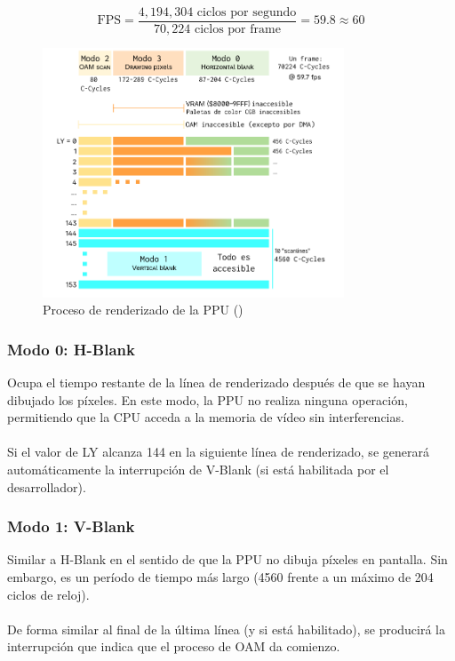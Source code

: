 \[
\text{FPS} = \frac{4,194,304 \text{ ciclos por segundo}}{70,224 \text{ ciclos por frame}} = 59.8 \approx 60
\]


\begin{figure}[H]
    \centering
    \includegraphics[width=0.8\textwidth]{include/images/render_gb.png}
    \caption{Proceso de renderizado de la PPU (\cite{newpandocs})}
    \label{figure:gb_render}
\end{figure}

\subsubsection{Modo 0: H-Blank}
Ocupa el tiempo restante de la línea de renderizado después de que se hayan dibujado los píxeles. En este modo, la PPU no realiza ninguna operación, permitiendo que la CPU acceda a la memoria de vídeo sin interferencias.
\\\\
Si el valor de LY alcanza 144 en la siguiente línea de renderizado, se generará automáticamente la interrupción de V-Blank (si está habilitada por el desarrollador).

\subsubsection{Modo 1: V-Blank}
Similar a H-Blank en el sentido de que la PPU no dibuja píxeles en pantalla. Sin embargo, es un período de tiempo más largo (4560 frente a un máximo de 204 ciclos de reloj).
\\\\
De forma similar al final de la última línea (y si está habilitado), se producirá la interrupción que indica que el proceso de OAM da comienzo.

